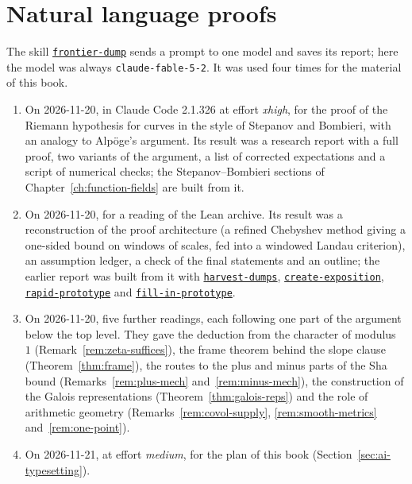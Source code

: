 \documentclass[11pt]{amsbook}
\theoremstyle{plain}
\theoremstyle{definition}
\theoremstyle{remark}
\numberwithin{equation}{section}
\numberwithin{figure}{chapter}
\numberwithin{table}{chapter}
\newcommand{\vtwoskillurl}{https://github.com/tdupu/%
agent-skills-public/blob/8d13efb5e66306aeae6e3b948bc463e7e2db1b65}
\newcommand{\vtwoskill}[1]{%
\href{\vtwoskillurl/skills/#1/SKILL.md}{\texttt{#1}}}
\begin{document}
\section{Natural language proofs}
\label{sec:ai-nlp}
The skill \vtwoskill{frontier-dump} sends a prompt to one model and
saves its report; here the model was always \texttt{claude-fable-5-2}.
It was used four times for the material of this book.
\begin{enumerate}[label=(\arabic*)]
\item On 2026-11-20, in Claude Code 2.1.326 at effort \emph{xhigh},
for the proof of the Riemann hypothesis for curves in the style of
Stepanov and Bombieri, with an analogy to Alp\"oge's argument. Its
result was a research report with a full proof, two variants of the
argument, a list of corrected expectations and a script of numerical
checks; the Stepanov--Bombieri sections of
Chapter~\ref{ch:function-fields} are built from it.
\item On 2026-11-20, for a reading of the Lean archive. Its result was
a reconstruction of the proof architecture (a refined Chebyshev method
giving a one-sided bound on windows of scales, fed into a windowed
Landau criterion), an assumption ledger, a check of the final
statements and an outline; the earlier report was built from it with
\vtwoskill{harvest-dumps}, \vtwoskill{create-exposition},
\vtwoskill{rapid-prototype} and \vtwoskill{fill-in-prototype}.
\item On 2026-11-20, five further readings, each following one part of
the argument below the top level. They gave the deduction from the
character of modulus~$1$ (Remark~\ref{rem:zeta-suffices}), the frame
theorem behind the slope clause (Theorem~\ref{thm:frame}), the routes to
the plus and minus parts of the Sha bound
(Remarks~\ref{rem:plus-mech} and~\ref{rem:minus-mech}), the
construction of the Galois representations
(Theorem~\ref{thm:galois-reps}) and the role of arithmetic geometry
(Remarks~\ref{rem:covol-supply}, \ref{rem:smooth-metrics}
and~\ref{rem:one-point}).
\item On 2026-11-21, at effort \emph{medium}, for the plan of this
book (Section~\ref{sec:ai-typesetting}).
\end{enumerate}
\end{document}
